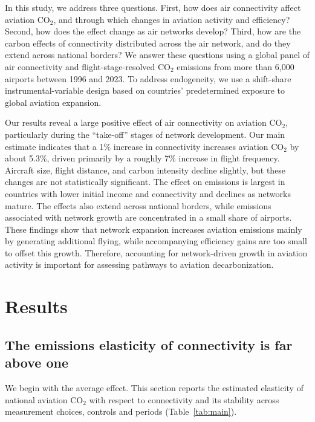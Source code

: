 \documentclass[12pt]{extarticle}
\begin{document}
In this study, we address three questions. First, how does air
connectivity affect aviation CO$_2$, and through which changes in
aviation activity and efficiency? Second, how does the effect change as
air networks develop? Third, how are the carbon effects of connectivity
distributed across the air network, and do they extend across national
borders? We answer these questions using a global panel of air
connectivity and flight-stage-resolved CO$_2$ emissions from more than
6{,}000 airports between 1996 and 2023. To address endogeneity, we use a
shift-share instrumental-variable design based on countries'
predetermined exposure to global aviation expansion.

Our results reveal a large positive effect of air connectivity on
aviation CO$_2$, particularly during the ``take-off'' stages of network
development. Our main estimate indicates that a 1\% increase in
connectivity increases aviation CO$_2$ by about 5.3\%, driven primarily
by a roughly 7\% increase in flight frequency. Aircraft size, flight
distance, and carbon intensity decline slightly, but these changes are
not statistically significant. The effect on emissions is largest in
countries with lower initial income and connectivity and declines as
networks mature. The effects also extend across national borders, while
emissions associated with network growth are concentrated in a small
share of airports. These findings show that network expansion increases
aviation emissions mainly by generating additional flying, while
accompanying efficiency gains are too small to offset this growth.
Therefore, accounting for network-driven growth in aviation activity is
important for assessing pathways to aviation decarbonization.

\section*{Results}
\subsection*{The emissions elasticity of connectivity is far above one}
We begin with the average effect. This section reports the estimated
elasticity of national aviation CO$_2$ with respect to connectivity and
its stability across measurement choices, controls and periods
(Table~\ref{tab:main}).
\end{document}
